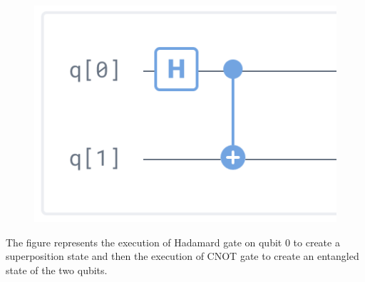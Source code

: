 \begin{figure}[htbp!]
	\centering
	\includegraphics[scale=0.30]{img_11}
\end{figure}
The figure represents the execution of Hadamard gate on qubit 0 to create a superposition state and then the execution of CNOT gate to create an entangled state of the two qubits.\\

